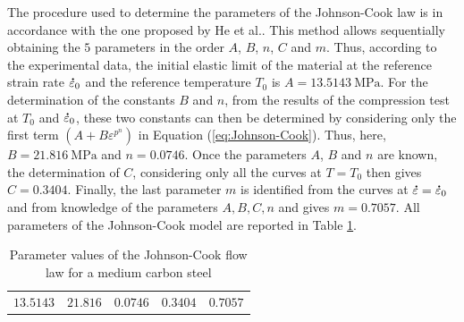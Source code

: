 \documentclass[metals,article,submit,pdftex,moreauthors]{Definitions/mdpi}
\makeatletter
\DeclareRobustCommand{\mdot}[1]{\accentset{\mbox{\bfseries .}}{#1}}
\DeclareRobustCommand{\eal}{et al.\@\xspace}
\DeclareRobustCommand{\MPa}{\text{MPa}}
\makeatother
\begin{document}
The procedure used to determine the parameters of the Johnson-Cook law is in accordance with the one proposed by He \eal \cite{zeng2022constitutive}.
This method allows sequentially obtaining the $5$ parameters in the order $A$, $B$, $n$, $C$ and $m$.
Thus, according to the experimental data, the initial elastic limit of the material at the reference strain rate $\mdot\varepsilon_0$ and the reference temperature $T_0$ is $A=13.5143~\MPa$.
For the determination of the constants $B$ and $n$, from the results of the compression test at $T_0$ and $\mdot\varepsilon_0$, these two constants can then be determined by considering only the first term $\left(A+B\varepsilon^{p^{n}}\right)$ in Equation (\ref{eq:Johnson-Cook}).
Thus, here, $B=21.816~\MPa$ and $n=0.0746$.
Once the parameters $A$, $B$ and $n$ are known, the determination of $C$, considering only all the curves at $T=T_0$ then gives $C=0.3404$.
Finally, the last parameter $m$ is identified from the curves at $\mdot\varepsilon=\mdot\varepsilon_0$ and from knowledge of the parameters $A, B, C, n$ and gives $m=0.7057$.
All parameters of the Johnson-Cook model are reported in Table \ref{tab:JC}.

\begin{table}[h!]
\centering
\caption{Parameter values of the Johnson-Cook flow law for a medium carbon steel}
\begin{tabular}{ccccc}
	\toprule
	\boldmath{$A~(\MPa)$} & \boldmath{$B~(\MPa)$} & \boldmath{$n$} & \boldmath{$C$} & \boldmath{$m$} \\ \midrule
	      $13.5143$       &       $21.816$        &    $0.0746$    &    $0.3404$    &    $0.7057$    \\ \bottomrule
\end{tabular}
\label{tab:JC}
\end{table}
\end{document}
